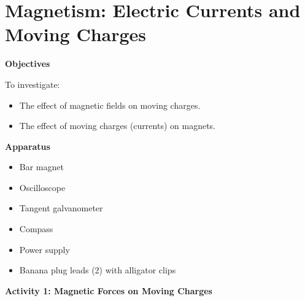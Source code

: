 
\section{Magnetism: Electric Currents and Moving Charges}

\makelabheader %

\textbf{Objectives}

To investigate:

\begin{itemize}
\item The effect of magnetic fields on moving charges. 
\item The effect of moving charges (currents) on magnets. 
\end{itemize}

\textbf{Apparatus} 

\begin{itemize} 
\item Bar magnet
\item Oscilloscope
\item Tangent galvanometer
\item Compass
\item Power supply
\item Banana plug leads (2) with alligator clips
\end{itemize}





\textbf{Activity 1: Magnetic Forces on Moving Charges }

